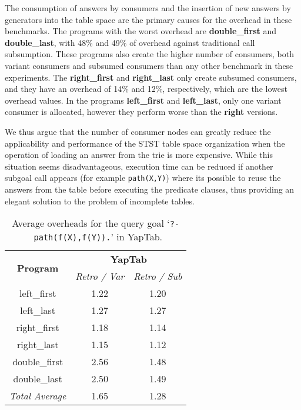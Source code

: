 The consumption of answers by consumers and the insertion of new answers by generators into the table
space are the primary causes for the overhead in these benchmarks. The programs with the
worst overhead are \textbf{double\_first} and \textbf{double\_last}, with 48\% and 49\% of overhead
against traditional call subsumption. These programs also create the higher number of consumers,
both variant consumers and subsumed consumers than any other benchmark in these experiments.
The \textbf{right\_first} and \textbf{right\_last} only create subsumed consumers, and they have an overhead
of 14\% and 12\%, respectively, which are the lowest overhead values. In the programs \textbf{left\_first} and
\textbf{left\_last}, only one variant consumer is allocated, however they perform worse than the \textbf{right} versions.

We thus argue that the number of consumer nodes can greatly reduce the
applicability and performance of the STST table space organization when the operation of loading an answer
from the trie is more expensive. While this situation seems disadvantageous, execution time can
be reduced if another subgoal call appears (for example \texttt{path(X,Y)}) where its possible to
reuse the answers from the table before executing the predicate clauses, thus providing an
elegant solution to the problem of incomplete tables.

\begin{table}[ht]
\centering
  \begin{tabular}{ccc}
   \hline
    \hline
    \multirow{2}{*}{\textbf{Program}} & \multicolumn{2}{c}{\textbf{YapTab}} \\
    & \textit{\small{Retro / Var}} & \textit{\small{Retro / Sub}} \\
   \hline
   \hline
   left\_first & 1.22 & 1.20 \\
   left\_last & 1.27 & 1.27 \\
   right\_first & 1.18 & 1.14 \\
   right\_last & 1.15 & 1.12 \\
double\_first & 2.56 & 1.48 \\
double\_last & 2.50 & 1.49 \\
\hline
\hline
\textit{Total Average} & 1.65 & 1.28 \\
\hline
\hline
\end{tabular}
\caption{Average overheads for the query goal `\texttt{?-~path(f(X),f(Y)).}' in YapTab.}
\label{tbl:results_average_stst}
\end{table}

